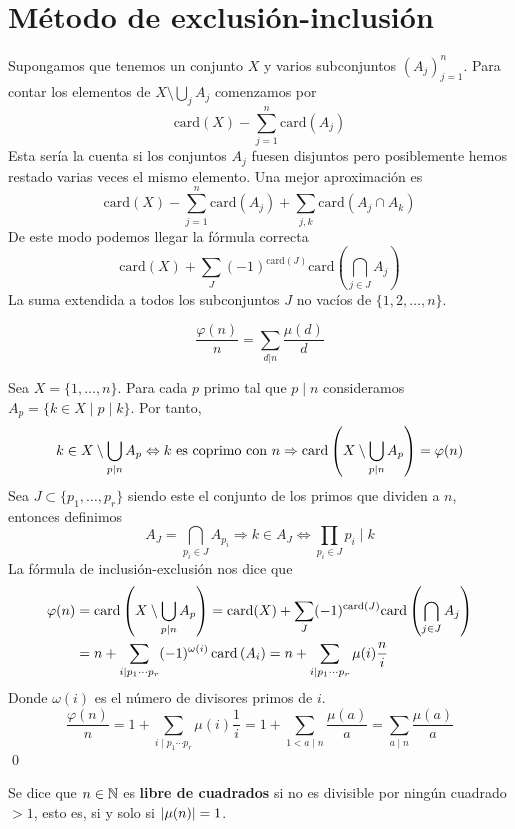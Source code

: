 \documentclass[TAN.tex]{subfiles}
\begin{document}
\section{Método de exclusión-inclusión}
Supongamos que tenemos un conjunto $X$ y varios subconjuntos $(A_j)_{j=1}^n$. Para contar los elementos de $X \setminus \bigcup_j A_j$ comenzamos por
\[ \text{card}(X) - \sum_{j=1}^n \text{card}(A_j) \]
Esta sería la cuenta si los conjuntos $A_j$ fuesen disjuntos pero posiblemente hemos restado varias veces el mismo elemento. Una mejor aproximación es
\[ \text{card}(X) - \sum_{j=1}^n \text{card}(A_j) + \sum_{j,k} \text{card}(A_j \cap A_k) \]
De este modo podemos llegar la fórmula correcta
\[ \text{card}(X) + \sum_J (-1)^{\text{card}(J)} \text{card}\left(\bigcap_{j\in J} A_j\right) \]
La suma extendida a todos los subconjuntos $J$ no vacíos de $\{1,2,\dots,n\}$.

\begin{prop}
\[ \frac{φ(n)}{n} = \sum_{d|n} \frac{μ(d)}{d} \]
\end{prop}
\begin{dem}
Sea $X=\{1,\dotsc,n\}$. Para cada $p$ primo tal que $p\mid n$ consideramos $A_p =\{k\in X\mid p\mid k\}$. Por tanto, 
$$k\in X \setminus \bigcup_{p\mid n} A_p \Leftrightarrow \text{$k$ es coprimo con $n$} \Rightarrow \operatorname{card}\left( X \setminus \bigcup_{p\mid n} A_p\right) = \varphi(n)
$$
Sea $J\subset \{p_1,\dotsc,p_r\}$ siendo este el conjunto de los primos que dividen a $n$, entonces definimos
$$
A_J = \bigcap_{p_i \in J}A_{p_i} \Rightarrow k \in A_J \Leftrightarrow \prod_{p_i\in J} p_i \mid k
$$
La fórmula de inclusión-exclusión nos dice que
\begin{align*}
\varphi(n) &= \operatorname{card}\left( X \setminus \bigcup_{p\mid n} A_p\right) =  \text{card}(X) + \sum_J (-1)^{\text{card}(J)} \text{card}\left(\bigcap_{j\in J} A_j\right)\\
&= n + \sum_{i\mid p_1\cdots p_r} (-1)^{\omega(i)} \operatorname{card}\left(A_i\right) = n + \sum_{i\mid p_1 \cdots p_r} \mu(i)\frac{n}{i}
\end{align*}
Donde $\omega(i)$ es el número de divisores primos de $i$.
$$
\frac{\varphi(n)}{n} = 1 + \sum_{i\mid p_1 \cdots p_r} \mu(i)\frac{1}{i} = 1 + \sum_{1<a\mid n}\frac{\mu(a)}{a} = \sum_{a\mid n} \frac{\mu(a)}{a}
$$
\qed
\end{dem}
Se dice que $n \in \mathbb{N}$ es \textbf{libre de cuadrados} si no es divisible por ningún cuadrado $> 1$, esto es, si y solo si $\left|\mu(n)\right|=1$.
\end{document}

